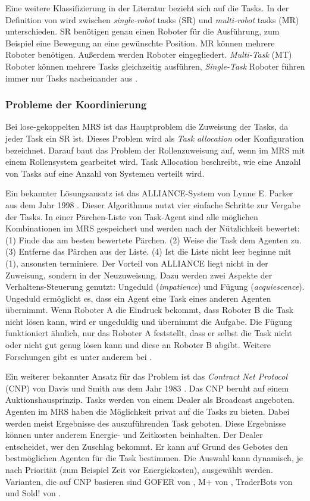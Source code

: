 Eine weitere Klassifizierung in der Literatur bezieht sich auf die Tasks. In der Definition von \cite{gerkey2004formal} wird zwischen \textit{single-robot} tasks (SR) und \textit{multi-robot} tasks (MR) unterschieden. SR benötigen genau einen Roboter für die Ausführung, zum Beispiel eine Bewegung an eine gewünschte Position. MR können mehrere Roboter benötigen. Außerdem werden Roboter eingegliedert. \textit{Multi-Task} (MT) Roboter können mehrere Tasks gleichzeitig ausführen, \textit{Single-Task} Roboter führen immer nur Tasks nacheinander aus \citep{lundh2006plan}. 

\subsubsection{Probleme der Koordinierung}
\label{sec:prob-koor}
Bei lose-gekoppelten MRS ist das Hauptproblem die Zuweisung der Tasks, da jeder Task ein SR ist. Dieses Problem wird als \textit{Task allocation} oder Konfiguration bezeichnet. Darauf baut das Problem der Rollenzuweisung auf, wenn im MRS mit einem Rollensystem gearbeitet wird. Task Allocation beschreibt, wie eine Anzahl von Tasks auf eine Anzahl von Systemen verteilt wird.

Ein bekannter Lösungsansatz ist das ALLIANCE-System von Lynne E. Parker aus dem Jahr 1998 \citep{parker1998alliance}. Dieser Algorithmus nutzt vier einfache Schritte zur Vergabe der Tasks. In einer Pärchen-Liste von Task-Agent sind alle möglichen Kombinationen im MRS gespeichert und werden nach der Nützlichkeit bewertet: (1) Finde das am besten bewertete Pärchen. (2) Weise die Task dem Agenten zu. (3) Entferne das Pärchen aus der Liste. (4) Ist die Liste nicht leer beginne mit (1), ansonsten terminiere. Der Vorteil von ALLIANCE liegt nicht in der Zuweisung, sondern in der Neuzuweisung. Dazu werden zwei Aspekte der Verhaltens-Steuerung genutzt: Ungeduld (\textit{impatience}) und Fügung (\textit{acquiescence}). Ungeduld ermöglicht es, dass ein Agent eine Task eines anderen Agenten übernimmt. Wenn Roboter A die Eindruck bekommt, dass Roboter B die Task nicht lösen kann, wird er ungeduldig und übernimmt die Aufgabe. Die Fügung funktioniert ähnlich, nur das Roboter A feststellt, dass er selbst die Task nicht oder nicht gut genug lösen kann und diese an Roboter B abgibt. Weitere Forschungen gibt es unter anderem bei \citep{werger2000broadcast}.

Ein weiterer bekannter Ansatz für das Problem ist das \textit{Contract Net Protocol} (CNP) von Davis und Smith aus dem Jahr 1983  \citep{davis2003negotiation}. Das CNP beruht auf einem Auktionshausprinzip. Tasks werden von einem Dealer als Broadcast angeboten. Agenten im MRS haben die Möglichkeit privat auf die Tasks zu bieten. Dabei werden meist Ergebnisse des auszuführenden Task geboten. Diese Ergebnisse können unter anderem Energie- und Zeitkosten beinhalten. Der Dealer entscheidet, wer den Zuschlag bekommt. Er kann auf Grund des Gebotes den bestmöglichen Agenten für die Task bestimmen. Die Auswahl kann dynamisch, je nach Priorität (zum Beispiel Zeit vor Energiekosten), ausgewählt werden. Varianten, die auf CNP basieren sind GOFER von \cite{caloud1990indoor}, M+ von \cite{botelho1999m+}, TraderBots von\cite{dias2000market} und Sold! von \cite{gerkey2002sold}.

